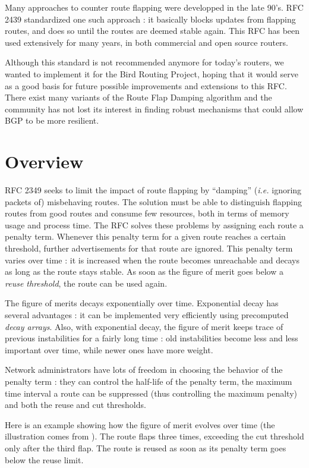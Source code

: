 \documentclass[a4paper,english]{IEEEtran}
\begin{document}
Many approaches to counter route flapping were developped in
the late 90's. RFC 2439\cite{rfc2439} standardized one such approach
: it basically blocks updates from flapping routes, and does so until
the routes are deemed stable again. This RFC has been used extensively
for many years, in both commercial and open source routers.

Although this standard is not recommended anymore\cite{ripe recommendations}
for today's routers, we wanted to implement it for the Bird Routing
Project\cite{bird}, hoping that it would serve as a good basis for
future possible improvements and extensions to this RFC. There exist
many variants of the Route Flap Damping algorithm and the community
has not lost its interest in finding robust mechanisms that could
allow BGP to be more resilient.


\section{Overview}

RFC 2349 seeks to limit the impact of route flapping by ``damping''
(\textit{i.e.} ignoring packets of) misbehaving routes. The solution
must be able to distinguish flapping routes from good routes and consume
few resources, both in terms of memory usage and process time. The
RFC solves these problems by assigning each route a penalty term.
Whenever this penalty term for a given route reaches a certain threshold,
further advertisements for that route are ignored. This penalty term
varies over time : it is increased when the route becomes unreachable
and decays as long as the route stays stable. As soon as the figure
of merit goes below a \textit{reuse threshold}, the route can be used
again.

The figure of merits decays exponentially over time. Exponential decay
has several advantages : it can be implemented very efficiently using
precomputed \textit{decay arrays}. Also, with exponential decay, the
figure of merit keeps trace of previous instabilities for a fairly
long time : old instabilities become less and less important over
time, while newer ones have more weight.

Network administrators have lots of freedom in choosing the behavior
of the penalty term : they can control the half-life of the penalty
term, the maximum time interval a route can be suppressed (thus 
controlling the maximum penalty) and both the reuse and cut thresholds.

Here is an example showing how the figure of merit evolves over time
(the illustration comes from \cite{damping-pic}). The route flaps
three times, exceeding the cut threshold only after the third flap.
The route is reused as soon as its penalty term goes below the reuse
limit.
\end{document}
